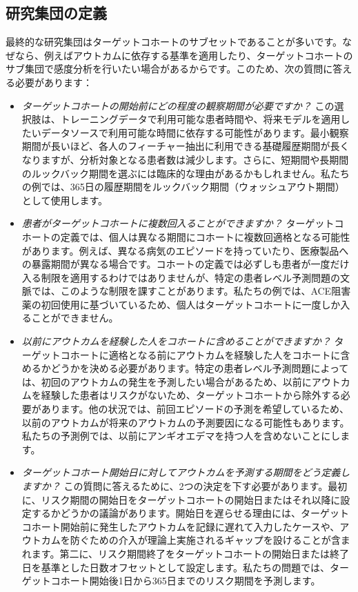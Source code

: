\documentclass[
  11pt]{book}
\theoremstyle{definition}
\theoremstyle{definition}
\theoremstyle{definition}
\theoremstyle{definition}
\theoremstyle{remark}
\begin{document}
\subsection{研究集団の定義}\label{ux7814ux7a76ux96c6ux56e3ux306eux5b9aux7fa9-1}

最終的な研究集団はターゲットコホートのサブセットであることが多いです。なぜなら、例えばアウトカムに依存する基準を適用したり、ターゲットコホートのサブ集団で感度分析を行いたい場合があるからです。このため、次の質問に答える必要があります：

\begin{itemize}
\item
  \emph{ターゲットコホートの開始前にどの程度の観察期間が必要ですか？} この選択肢は、トレーニングデータで利用可能な患者時間や、将来モデルを適用したいデータソースで利用可能な時間に依存する可能性があります。最小観察期間が長いほど、各人のフィーチャー抽出に利用できる基礎履歴期間が長くなりますが、分析対象となる患者数は減少します。さらに、短期間や長期間のルックバック期間を選ぶには臨床的な理由があるかもしれません。私たちの例では、365日の履歴期間をルックバック期間（ウォッシュアウト期間）として使用します。
\item
  \emph{患者がターゲットコホートに複数回入ることができますか？} ターゲットコホートの定義では、個人は異なる期間にコホートに複数回適格となる可能性があります。例えば、異なる病気のエピソードを持っていたり、医療製品への暴露期間が異なる場合です。コホートの定義では必ずしも患者が一度だけ入る制限を適用するわけではありませんが、特定の患者レベル予測問題の文脈では、このような制限を課すことがあります。私たちの例では、ACE阻害薬の初回使用に基づいているため、個人はターゲットコホートに一度しか入ることができません。
\item
  \emph{以前にアウトカムを経験した人をコホートに含めることができますか？} ターゲットコホートに適格となる前にアウトカムを経験した人をコホートに含めるかどうかを決める必要があります。特定の患者レベル予測問題によっては、初回のアウトカムの発生を予測したい場合があるため、以前にアウトカムを経験した患者はリスクがないため、ターゲットコホートから除外する必要があります。他の状況では、前回エピソードの予測を希望しているため、以前のアウトカムが将来のアウトカムの予測要因になる可能性もあります。私たちの予測例では、以前にアンギオエデマを持つ人を含めないことにします。
\item
  \emph{ターゲットコホート開始日に対してアウトカムを予測する期間をどう定義しますか？} この質問に答えるために、2つの決定を下す必要があります。最初に、リスク期間の開始日をターゲットコホートの開始日またはそれ以降に設定するかどうかの議論があります。開始日を遅らせる理由には、ターゲットコホート開始前に発生したアウトカムを記録に遅れて入力したケースや、アウトカムを防ぐための介入が理論上実施されるギャップを設けることが含まれます。第二に、リスク期間終了をターゲットコホートの開始日または終了日を基準とした日数オフセットとして設定します。私たちの問題では、ターゲットコホート開始後1日から365日までのリスク期間を予測します。

\end{itemize}
\end{document}
